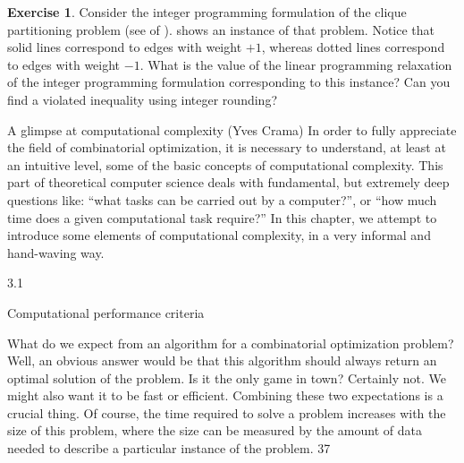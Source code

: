 \documentclass[titlepage]{book}
\theoremstyle{plain}
\theoremstyle{definition}
\newtheorem{exercise}{Exercise}[chapter]
\theoremstyle{remark}
\begin{document}
\begin{exercise}
Consider the integer programming formulation of the clique partitioning problem (see  of ).  shows an instance of that problem. Notice that solid lines correspond to edges with weight $+1$, whereas dotted lines correspond to edges with weight $-1$. What is the value of the linear programming relaxation of the integer programming formulation corresponding to this instance? Can you find a violated inequality using integer rounding?
\end{exercise}

A glimpse at computational
complexity (Yves Crama)
In order to fully appreciate the field of combinatorial optimization, it is necessary to understand, at least
at an intuitive level, some of the basic concepts of computational complexity. This part of theoretical
computer science deals with fundamental, but extremely deep questions like: “what tasks can be carried
out by a computer?”, or “how much time does a given computational task require?”
In this chapter, we attempt to introduce some elements of computational complexity, in a very informal
and hand-waving way.

3.1

Computational performance criteria

What do we expect from an algorithm for a combinatorial optimization problem? Well, an obvious answer
would be that this algorithm should always return an optimal solution of the problem. Is it the only game
in town? Certainly not. We might also want it to be fast or efficient. Combining these two expectations
is a crucial thing. Of course, the time required to solve a problem increases with the size of this problem,
where the size can be measured by the amount of data needed to describe a particular instance of the
problem.
37
\end{document}
